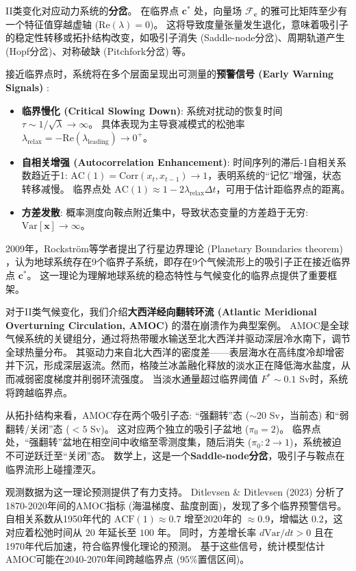 \documentclass[12pt, a4paper]{article}
\newcommand{\fastvar}{\bm{x}}          %
\newcommand{\slowvar}{\bm{c}}          %
\newcommand{\drift}{\mathcal{F}}  %
\newcommand{\predtime}{\tau}      %
\newcommand{\eigenval}{\lambda}         %
\begin{document}
II类变化对应动力系统的\textbf{分岔}。
在临界点 $\slowvar^*$ 处，向量场 $\drift_{\slowvar}$ 的雅可比矩阵至少有一个特征值穿越虚轴 ($\mathrm{Re}(\eigenval) = 0$)。
这将导致度量张量发生退化，意味着吸引子的稳定性转移或拓扑结构改变，如吸引子消失 (Saddle-node分岔)、周期轨道产生 (Hopf分岔)、对称破缺 (Pitchfork分岔) 等。

接近临界点时，系统将在多个层面呈现出可测量的\textbf{预警信号 (Early Warning Signals)} \cite{scheffer2009early}:
\begin{itemize}
    \item \textbf{临界慢化 (Critical Slowing Down)}:
    系统对扰动的恢复时间 $\predtime \sim 1/\sqrt{\eigenval} \to \infty$。
    具体表现为主导衰减模式的松弛率 $\eigenval_{\text{relax}} = -\mathrm{Re}(\eigenval_{\text{leading}}) \to 0^+$。
    \item \textbf{自相关增强 (Autocorrelation Enhancement)}:
    时间序列的滞后-1自相关系数趋近于1: $\mathrm{AC}(1) = \mathrm{Corr}(x_t, x_{t-1}) \to 1$，表明系统的“记忆”增强，状态转移减慢。
    临界点处 $\mathrm{AC}(1) \approx 1 - 2\eigenval_{\text{relax}}\Delta t$，可用于估计距临界点的距离。
    \item \textbf{方差发散}:
    概率测度向鞍点附近集中，导致状态变量的方差趋于无穷: $\mathrm{Var}[\fastvar] \to \infty$。
\end{itemize}

2009年，Rockström等学者提出了行星边界理论 (Planetary Boundaries theorem) \cite{rockstrom2009planetary}，认为地球系统存在9个临界子系统，即存在9个气候流形上的吸引子正在接近临界点 $\slowvar^*$。
这一理论为理解地球系统的稳态特性与气候变化的临界点提供了重要框架。

对于II类气候变化，我们介绍\textbf{大西洋经向翻转环流 (Atlantic Meridional Overturning Circulation, AMOC)} 的潜在崩溃作为典型案例。
AMOC是全球气候系统的关键组分，通过将热带暖水输送至北大西洋并驱动深层冷水南下，调节全球热量分布。
其驱动力来自北大西洋的密度差——表层海水在高纬度冷却增密并下沉，形成深层返流。然而，格陵兰冰盖融化释放的淡水正在降低海水盐度，从而减弱密度梯度并削弱环流强度。
当淡水通量超过临界阈值 $F^* \sim 0.1$ Sv时，系统将跨越临界点。

从拓扑结构来看，AMOC存在两个吸引子态: “强翻转”态 ($\sim 20$ Sv，当前态) 和“弱翻转/关闭”态 ($< 5$ Sv)。
这对应两个独立的吸引子盆地 ($\pi_0 = 2$)。
临界点处，“强翻转”盆地在相空间中收缩至零测度集，随后消失 ($\pi_0: 2 \to 1$)，系统被迫不可逆跃迁至“关闭”态。
数学上，这是一个\textbf{Saddle-node分岔}，吸引子与鞍点在临界流形上碰撞湮灭。

观测数据为这一理论预测提供了有力支持。
Ditlevsen \& Ditlevsen (2023) \cite{ditlevsen2023warning} 分析了1870-2020年间的AMOC指标 (海温梯度、盐度剖面)，发现了多个临界预警信号。
自相关系数从1950年代的 $\mathrm{ACF}(1) \approx 0.7$ 增至2020年的 $\approx 0.9$，增幅达 $0.2$，这对应着松弛时间从 $20$ 年延长至 $100$ 年。
同时，方差增长率 $d\mathrm{Var}/dt > 0$ 且在1970年代后加速，符合临界慢化理论的预测。
基于这些信号，统计模型估计AMOC可能在2040-2070年间跨越临界点 ($95\%$置信区间)。
\end{document}
